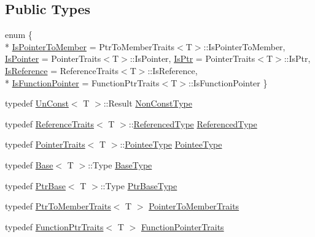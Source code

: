 \subsection*{Public Types}
\begin{DoxyCompactItemize}
\item 
enum \{ \\*
\hyperlink{structTypeTraits_a7d00c130b9615e3afde257e7c3fd13f0ab0215a0d7cca8fb1d5ee9ad8d85c6a34}{Is\+Pointer\+To\+Member} = Ptr\+To\+Member\+Traits$<$T$>$\+:\+:Is\+Pointer\+To\+Member, 
\hyperlink{structTypeTraits_a7d00c130b9615e3afde257e7c3fd13f0a261758a9f959760f3b3548870b1a63a8}{Is\+Pointer} = Pointer\+Traits$<$T$>$\+:\+:Is\+Pointer, 
\hyperlink{structTypeTraits_a7d00c130b9615e3afde257e7c3fd13f0a1b405e27f2e75d5f8e1125386889f26c}{Is\+Ptr} = Pointer\+Traits$<$T$>$\+:\+:Is\+Ptr, 
\hyperlink{structTypeTraits_a7d00c130b9615e3afde257e7c3fd13f0ac2f613fe3ca124cc8d7dca8881ea81ad}{Is\+Reference} = Reference\+Traits$<$T$>$\+:\+:Is\+Reference, 
\\*
\hyperlink{structTypeTraits_a7d00c130b9615e3afde257e7c3fd13f0a31d341beaeae2c828fee85b2e24bac68}{Is\+Function\+Pointer} = Function\+Ptr\+Traits$<$T$>$\+:\+:Is\+Function\+Pointer
 \}
\item 
typedef \hyperlink{structTypeTraits_1_1UnConst}{Un\+Const}$<$ T $>$\+::Result \hyperlink{structTypeTraits_a8bddd7673f5ec6d1ea2f2291a46ebaa9}{Non\+Const\+Type}
\item 
typedef \hyperlink{structTypeTraits_1_1ReferenceTraits}{Reference\+Traits}$<$ T $>$\+::\hyperlink{structTypeTraits_aad10ee3d301aeae33030c336748843b5}{Referenced\+Type} \hyperlink{structTypeTraits_aad10ee3d301aeae33030c336748843b5}{Referenced\+Type}
\item 
typedef \hyperlink{structTypeTraits_1_1PointerTraits}{Pointer\+Traits}$<$ T $>$\+::\hyperlink{structTypeTraits_a31db5eb2e960d2ee0850eca52c0d0a7c}{Pointee\+Type} \hyperlink{structTypeTraits_a31db5eb2e960d2ee0850eca52c0d0a7c}{Pointee\+Type}
\item 
typedef \hyperlink{structTypeTraits_1_1Base}{Base}$<$ T $>$\+::Type \hyperlink{structTypeTraits_a8e315caee6b2541aff4735f3ac18c653}{Base\+Type}
\item 
typedef \hyperlink{structTypeTraits_1_1PtrBase}{Ptr\+Base}$<$ T $>$\+::Type \hyperlink{structTypeTraits_a29eb4cf54863f51b99a7545b1edd04e4}{Ptr\+Base\+Type}
\item 
typedef \hyperlink{structTypeTraits_1_1PtrToMemberTraits}{Ptr\+To\+Member\+Traits}$<$ T $>$ \hyperlink{structTypeTraits_af78bc5f4a44e34c23ff3175d2aa0a97f}{Pointer\+To\+Member\+Traits}
\item 
typedef \hyperlink{structTypeTraits_1_1FunctionPtrTraits}{Function\+Ptr\+Traits}$<$ T $>$ \hyperlink{structTypeTraits_aa7ce0763f0b1fb8afb7faca47e20646f}{Function\+Pointer\+Traits}
\end{DoxyCompactItemize}


